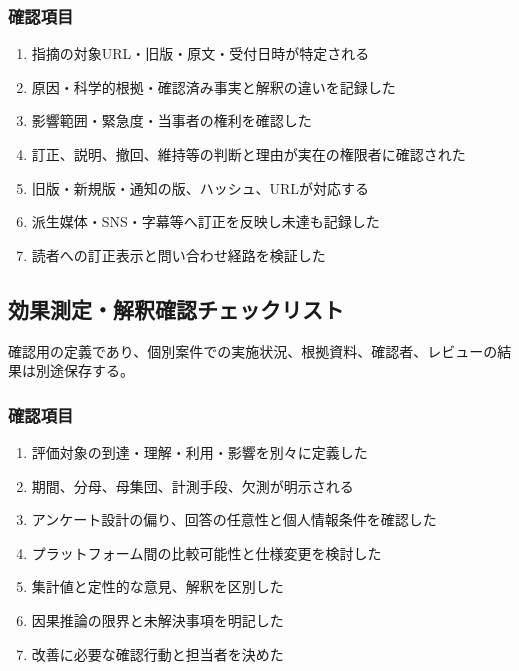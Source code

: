 \documentclass[a4paper,11pt]{article}
\begin{document}
\subsubsection*{確認項目}
\begin{enumerate}[leftmargin=2em,itemsep=0.3em]
\item 指摘の対象URL・旧版・原文・受付日時が特定される\par
\item 原因・科学的根拠・確認済み事実と解釈の違いを記録した\par
\item 影響範囲・緊急度・当事者の権利を確認した\par
\item 訂正、説明、撤回、維持等の判断と理由が実在の権限者に確認された\par
\item 旧版・新規版・通知の版、ハッシュ、URLが対応する\par
\item 派生媒体・SNS・字幕等へ訂正を反映し未達も記録した\par
\item 読者への訂正表示と問い合わせ経路を検証した\par
\end{enumerate}
\subsection{効果測定・解釈確認チェックリスト}
\par 確認用の定義であり、個別案件での実施状況、根拠資料、確認者、レビューの結果は別途保存する。\par\medskip
\subsubsection*{確認項目}
\begin{enumerate}[leftmargin=2em,itemsep=0.3em]
\item 評価対象の到達・理解・利用・影響を別々に定義した\par
\item 期間、分母、母集団、計測手段、欠測が明示される\par
\item アンケート設計の偏り、回答の任意性と個人情報条件を確認した\par
\item プラットフォーム間の比較可能性と仕様変更を検討した\par
\item 集計値と定性的な意見、解釈を区別した\par
\item 因果推論の限界と未解決事項を明記した\par
\item 改善に必要な確認行動と担当者を決めた\par
\end{enumerate}
\end{document}
